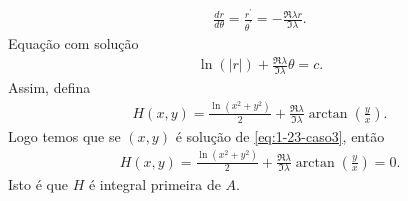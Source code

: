 \begin{homeworkProblem}[1-23]
\begin{solution}
\begin{itemize}
      \begin{align*}
        \frac{dr}{d\theta}=\frac{r^{\prime}}{\theta^{\prime}}=-\frac{\Re\lambda r}{\Im\lambda}.
      \end{align*}
      Equação com solução
      \begin{align*}
        \ln(|r|)+\frac{\Re\lambda}{\Im\lambda}\theta=c.
      \end{align*}
      Assim, defina
      \begin{align*}
        H(x,y)=\frac{\ln(x^{2}+y^{2})}{2}+\frac{\Re\lambda}{\Im\lambda}\arctan\left( \frac{y}{x} \right).
      \end{align*}
      Logo temos que se $(x,y)$ é solução de \eqref{eq:1-23-caso3}, então
      \begin{align*}
        H(x,y)=\frac{\ln(x^{2}+y^{2})}{2}+\frac{\Re\lambda}{\Im\lambda}\arctan\left( \frac{y}{x} \right)=0.
      \end{align*}
      Isto é que $H$ é integral primeira de $A$.
  \end{itemize}
  \end{solution}
\end{homeworkProblem}
